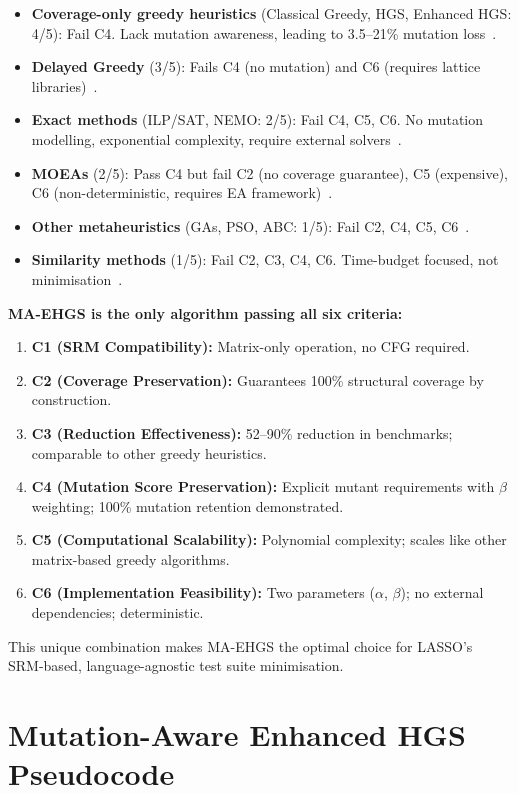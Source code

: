 \begin{appendices}
\begin{itemize}
  \item \textbf{Coverage-only greedy heuristics} (Classical Greedy, HGS, Enhanced HGS: 4/5): Fail C4. Lack mutation awareness, leading to 3.5--21\% mutation loss~\cite{noemmer2020}.
  \item \textbf{Delayed Greedy} (3/5): Fails C4 (no mutation) and C6 (requires lattice libraries)~\cite{tallam2005}.
  \item \textbf{Exact methods} (ILP/SAT, NEMO: 2/5): Fail C4, C5, C6. No mutation modelling, exponential complexity, require external solvers~\cite{elbaum2002,lin2018}.
  \item \textbf{MOEAs} (2/5): Pass C4 but fail C2 (no coverage guarantee), C5 (expensive), C6 (non-deterministic, requires EA framework)~\cite{wei2017}.
  \item \textbf{Other metaheuristics} (GAs, PSO, ABC: 1/5): Fail C2, C4, C5, C6~\cite{yoo2012,ahuja2024}.
  \item \textbf{Similarity methods} (1/5): Fail C2, C3, C4, C6. Time-budget focused, not minimisation~\cite{bach2017}.
\end{itemize}

\textbf{MA-EHGS is the only algorithm passing all six criteria:}
\begin{enumerate}
  \item \textbf{C1 (SRM Compatibility):} Matrix-only operation, no CFG required.
  \item \textbf{C2 (Coverage Preservation):} Guarantees 100\% structural coverage by construction.
  \item \textbf{C3 (Reduction Effectiveness):} 52--90\% reduction in benchmarks; comparable to other greedy heuristics.
  \item \textbf{C4 (Mutation Score Preservation):} Explicit mutant requirements with $\beta$ weighting; 100\% mutation retention demonstrated.
  \item \textbf{C5 (Computational Scalability):} Polynomial complexity; scales like other matrix-based greedy algorithms.
  \item \textbf{C6 (Implementation Feasibility):} Two parameters ($\alpha$, $\beta$); no external dependencies; deterministic.
\end{enumerate}

This unique combination makes MA-EHGS the optimal choice for LASSO's SRM-based, language-agnostic test suite minimisation.

\section{Mutation-Aware Enhanced HGS Pseudocode}
\label{app:pseudocode}


\end{appendices}
